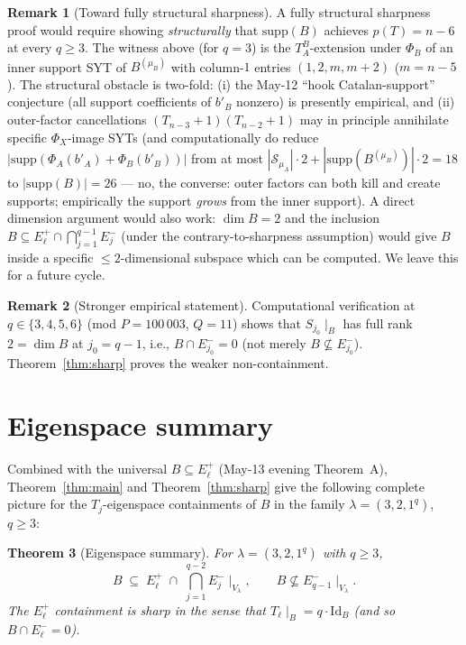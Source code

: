 \documentclass[11pt]{article}
\newtheorem{theorem}{Theorem}
\theoremstyle{definition}
\newtheorem{remark}[theorem]{Remark}
\newcommand{\supp}{\mathrm{supp}}
\begin{document}
\begin{remark}[Toward fully structural sharpness]\label{rem:structural-sharp-future}
A fully structural sharpness proof would require showing
\emph{structurally} that $\supp(B)$ achieves $p(T) = n - 6$ at
every $q \ge 3$.  The witness above (for $q = 3$) is the
$T_A^B$-extension under $\Phi_B$ of an inner support SYT of
$B^{(\mu_B)}$ with column-$1$ entries $(1, 2, m, m + 2)$ ($m = n - 5$).
The structural obstacle is two-fold: (i) the May-12 ``hook
Catalan-support'' conjecture (all support coefficients of $b'_B$
nonzero) is presently empirical, and (ii) outer-factor cancellations
$(T_{n-3}{+}1)(T_{n-2}{+}1)$ may in principle annihilate specific
$\Phi_X$-image SYTs (and computationally do reduce
$|\supp(\Phi_A(b'_A) + \Phi_B(b'_B))|$ from at most $|\mathcal{S}_{\mu_A}|
\cdot 2 + |\supp(B^{(\mu_B)})| \cdot 2 = 18$ to $|\supp(B)| = 26$ —
no, the converse: outer factors can both kill and create supports;
empirically the support \emph{grows} from the inner support).  A
direct dimension argument would also work: $\dim B = 2$ and the
inclusion $B \subseteq E_\ell^+ \cap \bigcap_{j = 1}^{q - 1} E_j^-$
(under the contrary-to-sharpness assumption) would give $B$ inside
a specific $\le 2$-dimensional subspace which can be computed.  We
leave this for a future cycle.
\end{remark}

\begin{remark}[Stronger empirical statement]\label{rem:stronger-sharp}
Computational verification at $q \in \{3, 4, 5, 6\}$ (mod
$P = 100\,003$, $Q = 11$) shows that $S_{j_0}\!\mid_B$ has full rank
$2 = \dim B$ at $j_0 = q - 1$, i.e., $B \cap E_{j_0}^- = 0$ (not
merely $B \not\subseteq E_{j_0}^-$).  Theorem~\ref{thm:sharp} proves
the weaker non-containment.
\end{remark}

\section{Eigenspace summary}\label{sec:summary}

Combined with the universal $B \subseteq E_\ell^+$ (May-13 evening
Theorem~A), Theorem~\ref{thm:main} and Theorem~\ref{thm:sharp} give
the following complete picture for the $T_j$-eigenspace containments
of $B$ in the family $\lambda = (3, 2, 1^q)$, $q \ge 3$:

\begin{theorem}[Eigenspace summary]\label{thm:summary}
For $\lambda = (3, 2, 1^q)$ with $q \ge 3$,
\[
   B \;\subseteq\; E_\ell^+\;\cap\;\bigcap_{j = 1}^{q - 2} E_j^-\!\mid_{V_\lambda},
   \qquad
   B \not\subseteq E_{q - 1}^-\!\mid_{V_\lambda}.
\]
The $E_\ell^+$ containment is sharp in the sense that
$T_\ell\!\mid_B = q\!\cdot\!\mathrm{Id}_B$ (and so $B \cap
E_\ell^- = 0$).
\end{theorem}
\end{document}
